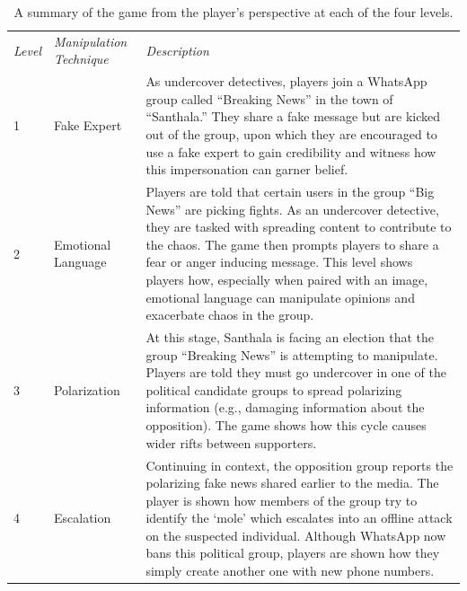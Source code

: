 \documentclass[empirical, authordate, issue]{jote-new-article}
\begin{document}
\begin{table}[h!]

  \begin{fullwidth}
    \caption{A summary of the game from the player's perspective at each of the four levels. }
    \label{tab:table1}


    \begin{tabularx}{\linewidth}{@{}l  l  >{\RaggedRight\arraybackslash}X@{}}

      \emph{Level} & \emph{Manipulation Technique} & \emph{Description}                                                                                                                                                                                                                                                                                                                                                                                        \\
      1            & Fake Expert                   & As undercover detectives, players join a \mbox{WhatsApp} group called “Breaking News” in the town of “Santhala.” They share a fake message but are kicked out of the group, upon which they are encouraged to use a fake expert to gain credibility and witness how this impersonation can garner belief.                                                                                                 \\
      2            & Emotional Language            & Players are told that certain users in the group “Big News” are picking fights. As an undercover detective, they are tasked with spreading content to contribute to the chaos. The game then prompts players to share a fear or anger inducing message. This level shows players how, especially when paired with an image, emotional language can manipulate opinions and exacerbate chaos in the group. \\
      3            & Polarization                  & At this stage, Santhala is facing an election that the group “Breaking News” is attempting to manipulate. Players are told they must go undercover in one of the political candidate groups to spread polarizing information (e.g., damaging information about the opposition). The game shows how this cycle causes wider rifts between supporters.                                                      \\
      4            & Escalation                    & Continuing in context, the opposition group reports the polarizing fake news shared earlier to the media. The player is shown how members of the group try to identify the ‘mole' which escalates into an offline attack on the suspected individual. Although \mbox{WhatsApp} now bans this political group, players are shown how they simply create another one with new phone numbers.                \\
    \end{tabularx}

  \end{fullwidth}

\end{table}
\end{document}
